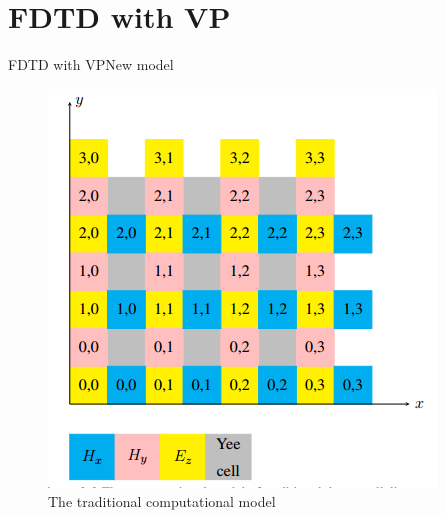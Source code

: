 \documentclass[11pt]{beamer}
\begin{document}
	\section{FDTD with VP}
	\begin{frame}{FDTD with VP}{New model}
		\begin{figure}
			\centering
			\begin{minipage}{0.45\textwidth}
				\centering
				\includegraphics[width=\textwidth]{old}
				\caption{The traditional computational model}
			\end{minipage}
			\begin{minipage}{0.4\textwidth}
				\centering

\end{minipage}
\end{figure}
\end{frame}
\end{document}
